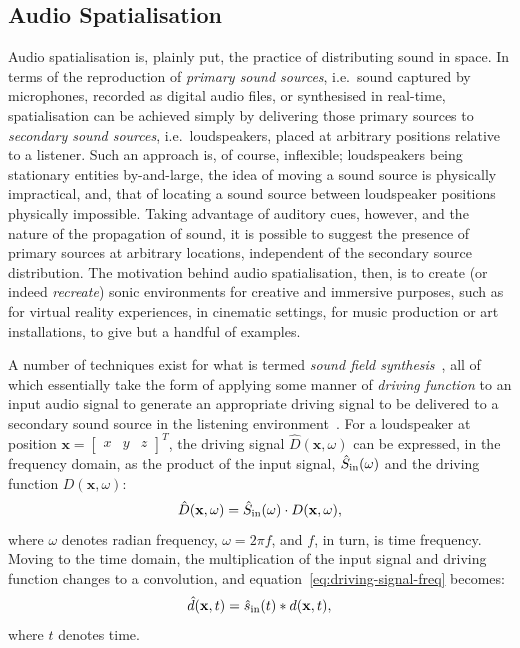 \subsection{Audio Spatialisation}\label{subsec:audio-spatialisation}

Audio spatialisation is, plainly put, the practice of distributing sound in
space.
In terms of the reproduction of \textit{primary sound sources}, i.e.\ sound
captured by microphones, recorded as digital audio files, or synthesised in
real-time, spatialisation can be achieved simply by delivering those primary
sources to \textit{secondary sound sources}, i.e.\ loudspeakers, placed at
arbitrary positions relative to a listener.
Such an approach is, of course, inflexible;
loudspeakers being stationary entities by-and-large, the idea of moving a sound
source is physically impractical, and, that of locating a sound source
between loudspeaker positions physically impossible.
Taking advantage of auditory cues, however, and the nature of the propagation
of sound, it is possible to suggest the presence of primary sources at
arbitrary locations, independent of the secondary source distribution.
The motivation behind audio spatialisation, then, is to create (or indeed
\textit{recreate}) sonic environments for creative and immersive purposes, such
as for virtual reality experiences, in cinematic settings, for music production
or art installations, to give but a handful of examples.

A number of techniques exist for what is termed \textit{sound field
synthesis}~\citep{ahrens_analytic_2012,nicol_sound_2017}, all of which
essentially take the form of applying some manner of \textit{driving function}
to an input audio signal to generate an appropriate driving signal to be
delivered to a secondary sound source in the listening
environment~\citep{ahrens_analytic_2012}.
For a loudspeaker at position $\mathbf{x} = \begin{bmatrix}
                                                x & y & z
\end{bmatrix}^T$, the driving signal $\hat{D}(\mathbf{x}, \omega)$ can be
expressed, in the frequency domain, as the product of the input signal,
$\hat{S}_{\text{in}}(\omega)$ and the driving function $D(\mathbf{x}, \omega)$:
\begin{equation}
    \label{eq:driving-signal-freq}
    \hat{D}(\mathbf{x},\omega) = \hat{S}_{\text{in}}(\omega) \cdot D(\mathbf{x},\omega),
\end{equation}
where $\omega$ denotes radian frequency, $\omega = 2\pi f$, and $f$, in turn,
is time frequency.
Moving to the time domain, the multiplication of the input signal and driving
function changes to a convolution, and equation~\eqref{eq:driving-signal-freq}
becomes:
\begin{equation}
    \label{eq:driving-signal-time}
    \hat{d}(\mathbf{x},t) = \hat{s}_{\text{in}}(t) \ast d(\mathbf{x},t),
\end{equation}
where $t$ denotes time.

